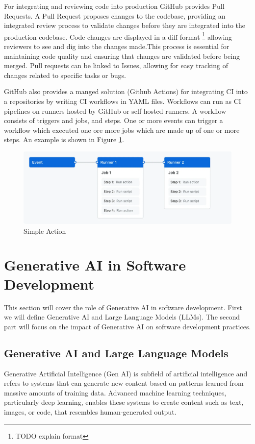 For integrating and reviewing code into production GitHub provides Pull Requests. A Pull Request proposes changes to the codebase, providing an integrated review process to validate changes before they are integrated into the production codebase. Code changes are displayed in a diff format \footnote{TODO explain format} allowing reviewers to see and dig into the changes made.This process is essential for maintaining code quality and ensuring that changes are validated before being merged. %
Pull requests can be linked to Issues, allowing for easy tracking of changes related to specific tasks or bugs. %

GitHub also provides a manged solution (Github Actions) for integrating CI into a repositories by writing CI workflows in YAML files. Workflows can run as CI pipelines on runners hosted by GitHub or self hosted runners. A workflow consists of triggers and jobs, and steps. One or more events can trigger a workflow which executed one ore more jobs which are made up of one or more steps. \cite{Workflows} An example is shown in Figure \ref{fig:gh-workflow}.
\FloatBarrier
\begin{figure}[htbp]
    \centering
    \includegraphics[width=1\textwidth]{images/overview-actions-simple.png}
    \caption{Simple Action}
    \label{fig:gh-workflow}
\end{figure}
\FloatBarrier

\section{Generative AI in Software Development}
This section will cover the role of Generative AI in software development. First we will define Generative AI and Large Language Models (LLMs). The second part will focus on the impact of Generative AI on software development practices.
\subsection{Generative AI and Large Language Models}
Generative Artificial Intelligence (Gen AI) is subfield of artificial intelligence and refers to systems that can generate new content based on patterns learned from massive amounts of training data. Advanced machine learning techniques, particularly deep learning, enables these systems to create content such as text, images, or code, that resembles human-generated output.

